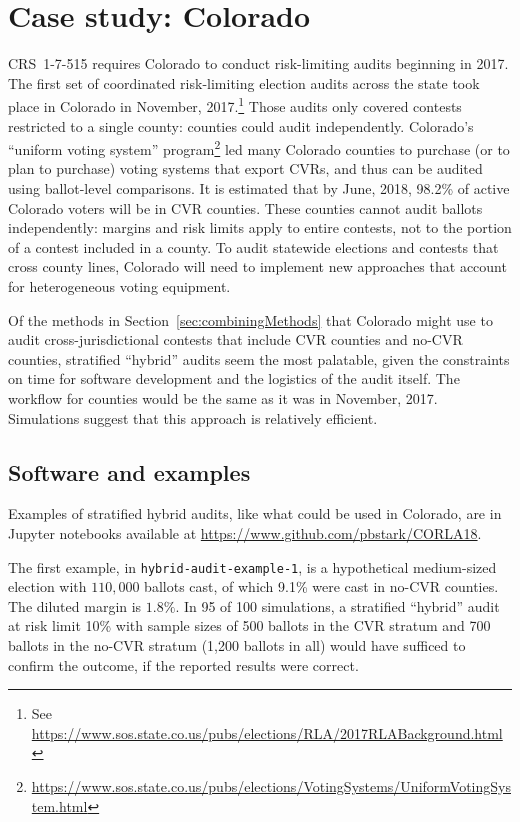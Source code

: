 \documentclass[runningheads]{llncs}
\begin{document}
\section{Case study: Colorado}\label{sec:colorado}


CRS~1-7-515 requires Colorado to conduct risk-limiting audits beginning in 2017.
The first set of coordinated risk-limiting election audits across the state took place in Colorado in November, 2017.\footnote{%
 See \url{https://www.sos.state.co.us/pubs/elections/RLA/2017RLABackground.html}
}
Those audits only covered contests restricted to a single county:
counties could audit independently.
Colorado's ``uniform voting system'' program\footnote{%
  \url{https://www.sos.state.co.us/pubs/elections/VotingSystems/UniformVotingSystem.html}
} 
led many Colorado counties to purchase (or to plan to purchase) voting systems
that export CVRs, and thus can be audited using ballot-level comparisons.
It is estimated that by June, 2018, 98.2\% of active Colorado voters will be in CVR counties.
These counties cannot audit ballots independently:
margins and risk limits apply to entire contests, not to the portion of a contest included in a county.
To audit statewide elections and contests that cross county lines, Colorado will need to implement new approaches
that account for heterogeneous voting equipment.


Of the methods in Section~\ref{sec:combiningMethods} that Colorado might use to audit cross-jurisdictional contests
that include CVR counties and no-CVR counties,
stratified ``hybrid'' audits seem the most palatable,
given the constraints on time for software development and the logistics
of the audit itself. 
The workflow for counties would be the same
as it was in November, 2017.
Simulations suggest that this approach is relatively efficient.


\subsection{Software and examples}
Examples of stratified hybrid audits, like what could be used in Colorado, are in Jupyter notebooks available
at \url{https://www.github.com/pbstark/CORLA18}.

The first example, in \texttt{hybrid-audit-example-1}, is a hypothetical medium-sized election with 
$110,000$ ballots cast, of which 
9.1\% were cast in no-CVR counties. 
The diluted margin is $1.8\%$.
In 95 of 100 simulations, a stratified ``hybrid'' audit at risk limit 10\% with sample sizes of 500 ballots 
in the CVR stratum and 700 ballots in the no-CVR stratum
(1,200 ballots in all)
would have sufficed to confirm the outcome, if the reported results were correct.
\end{document}
